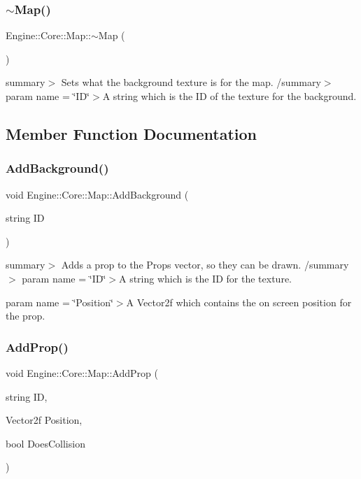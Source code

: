 \subsubsection{\texorpdfstring{$\sim$\+Map()}{~Map()}}
{\footnotesize\ttfamily Engine\+::\+Core\+::\+Map\+::$\sim$\+Map (\begin{DoxyParamCaption}{ }\end{DoxyParamCaption})}

summary$>$ Sets what the background texture is for the map. /summary$>$ param name = \char`\"{}\+I\+D\char`\"{}$>$A string which is the ID of the texture for the background.

\subsection{Member Function Documentation}
\mbox{\label{class_engine_1_1_core_1_1_map_aa81a28822b49c3c7750f0444a189ed8c}} 
\subsubsection{\texorpdfstring{Add\+Background()}{AddBackground()}}
{\footnotesize\ttfamily void Engine\+::\+Core\+::\+Map\+::\+Add\+Background (\begin{DoxyParamCaption}\item[{string}]{ID }\end{DoxyParamCaption})}

summary$>$ Adds a prop to the Props vector, so they can be drawn. /summary$>$ param name = \char`\"{}\+I\+D\char`\"{}$>$A string which is the ID for the texture.

param name = \char`\"{}\+Position\char`\"{}$>$A Vector2f which contains the on screen position for the prop.\mbox{\label{class_engine_1_1_core_1_1_map_a7aa7b53aadcd106a169eb19435bba5ab}} 
\subsubsection{\texorpdfstring{Add\+Prop()}{AddProp()}}
{\footnotesize\ttfamily void Engine\+::\+Core\+::\+Map\+::\+Add\+Prop (\begin{DoxyParamCaption}\item[{string}]{ID,  }\item[{Vector2f}]{Position,  }\item[{bool}]{Does\+Collision }\end{DoxyParamCaption})}

